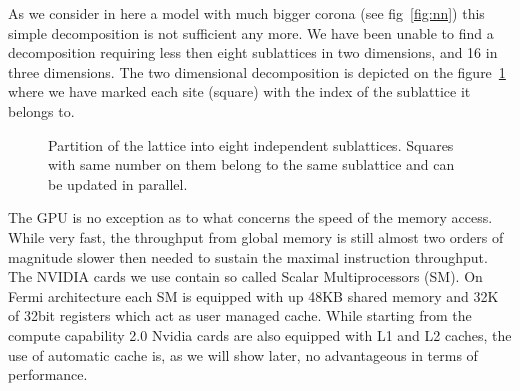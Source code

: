 \documentclass[a4paper]{llncs}
\def\bksize{8}
\begin{document}
As we consider in here a model with much bigger corona (see
fig~\ref{fig:nn}) this simple decomposition is not sufficient any more.
We have been unable to find a decomposition requiring less then eight
sublattices in two dimensions, and 16 in three dimensions. The two
dimensional decomposition is depicted on the figure~\ref{fig:part}
where we have marked each site (square) with the index of the
sublattice it belongs to.
\begin{figure}
\begin{center} 
\end{center}
\caption{\label{fig:part}Partition of the lattice into eight
  independent sublattices. Squares with same number on them belong to
  the same sublattice and can be updated in parallel.}
\end{figure}



The GPU is no exception as to what concerns the speed of the memory
access.  While very fast, the throughput from global memory is still
almost two orders of magnitude slower then needed to sustain the
maximal instruction throughput.  The NVIDIA cards we use contain so
called { Scalar Multiprocessors} (SM). On Fermi architecture each SM
is equipped with up 48KB shared memory and 32K of 32bit
registers\cite{Fermi} which act as user managed cache. While starting
from the compute capability 2.0 Nvidia cards are also equipped with L1
and L2 caches, the use of automatic cache is, as we will show later,
no advantageous in terms of performance.
\end{document}
